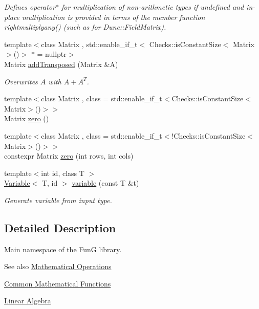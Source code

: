 \begin{DoxyCompactItemize}
\begin{DoxyCompactList}\small\item\em Defines operator$\ast$ for multiplication of non-\/arithmetic types if undefined and in-\/place multiplication is provided in terms of the member function rightmultiplyany() (such as for Dune\+::\+Field\+Matrix). \end{DoxyCompactList}\item 
{\footnotesize template$<$class Matrix , std\+::enable\+\_\+if\+\_\+t$<$ Checks\+::is\+Constant\+Size$<$ Matrix $>$()$>$ $\ast$  = nullptr$>$ }\\Matrix \hyperlink{namespaceFunG_a0211d0d26c669d56b5113fd2292902e5}{add\+Transposed} (Matrix \&A)
\begin{DoxyCompactList}\small\item\em Overwrites $A$ with $A+A^T$. \end{DoxyCompactList}\item 
{\footnotesize template$<$class Matrix , class  = std\+::enable\+\_\+if\+\_\+t$<$\+Checks\+::is\+Constant\+Size$<$\+Matrix$>$()$>$$>$ }\\Matrix \hyperlink{namespaceFunG_a649b4470d6def401959bfea3a368c48c}{zero} ()
\item 
{\footnotesize template$<$class Matrix , class  = std\+::enable\+\_\+if\+\_\+t$<$!\+Checks\+::is\+Constant\+Size$<$\+Matrix$>$()$>$$>$ }\\constexpr Matrix \hyperlink{namespaceFunG_ae633433339ba30207aa526e54e3924b4}{zero} (int rows, int cols)
\item 
{\footnotesize template$<$int id, class T $>$ }\\\hyperlink{structFunG_1_1Variable}{Variable}$<$ T, id $>$ \hyperlink{namespaceFunG_a1c474456411f028e14eab67ff6eebe0c}{variable} (const T \&t)
\begin{DoxyCompactList}\small\item\em Generate variable from input type. \end{DoxyCompactList}\end{DoxyCompactItemize}


\subsection{Detailed Description}
Main namespace of the Fun\+G library. 

\begin{DoxySeeAlso}{See also}
\hyperlink{group__MathematicalOperationsGroup}{Mathematical Operations} 

\hyperlink{group__CMathGroup}{Common Mathematical Functions} 

\hyperlink{group__LinearAlgebraGroup}{Linear Algebra} 
\end{DoxySeeAlso}


